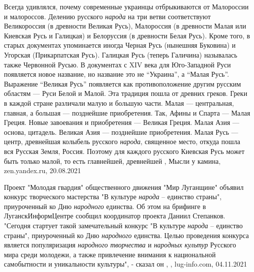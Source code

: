 Всегда удивлялся, почему современные украинцы отбрыкиваются от Малороссии и
малороссов. Делению русского \emph{народа} на три ветви соответствуют Великороссия (в
древности Великая Русь), Малороссия (в древности Малая или Киевская Русь и
Галицкая) и Белоруссия (в древности Белая Русь). Кроме того, в старых
документах упоминается иногда Черная Русь (нынешняя Буковина) и Угорская
(Прикарпатская Русь). Галицкая Русь (теперь Галичина) называлась также
Червонной Русью.  В документах с XIV века для Юго-Западной Руси появляется
новое название, но название это не \enquote{Украина}, а \enquote{Малая Русь}.
Выражение \enquote{Великая Русь} появляется как противоположение другим русским
областям — Руси Белой и Малой. Эта традиция пошла от древних греков. Греки в
каждой стране различали малую и большую части.  Малая — центральная, главная, а
большая — позднейшие приобретения. Так, Афины и Спарта — Малая Греция. Новые
завоевания и приобретения — Великая Греция. Малая Азия — основа, цитадель.
Великая Азия — позднейшие приобретения. Малая Русь — центр, древнейшая колыбель
русского \emph{народа}, священное место, откуда пошла вся Русская Земля,
Россия. Поэтому для каждого русского Киевская Русь может быть только малой, то
есть главнейшей, древнейшей
, Мысли у камина, zen.yandex.ru, 20.08.2021

Проект "Молодая гвардия" общественного движения "Мир Луганщине" объявил конкурс
творческого мастерства "В культуре \emph{народа} – единство страны",
приуроченный ко Дню \emph{народного} единства. Об этом на брифинге в
ЛуганскИнформЦентре сообщил координатор проекта Даниил Степанков.  "Сегодня
стартует такой замечательный конкурс "В культуре \emph{народа} – единство
страны", приуроченный ко Дню \emph{народного} единства. Целью проведения
конкурса является популяризация \emph{народного творчества} и \emph{народных
культур} Русского мира среди молодежи, а также привлечение внимания к
национальной самобытности и уникальности культуры", - сказал он
, 
, lug-info.com, 04.11.2021

